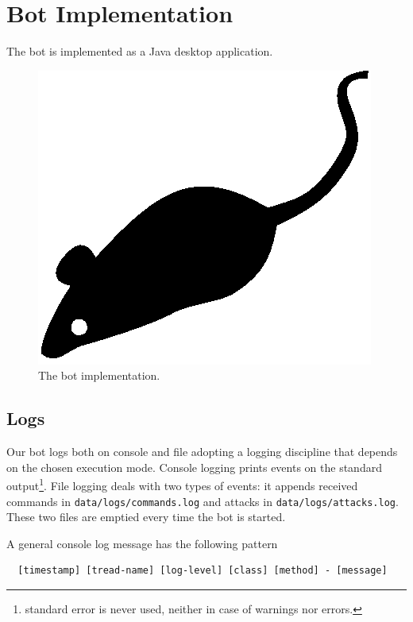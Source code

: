 \section{Bot Implementation}
\label{sec:bot-implementation}

The bot is implemented as a Java desktop application.

\begin{figure}[tp]
  \centering
  \includegraphics{./fig/acmlarge-mouse}
  \caption{The bot implementation.}
    \label{fig:bot-implementation}
\end{figure}

\subsection{Logs}
\label{sec:logs}

Our bot logs both on console and file adopting a logging discipline that depends on the chosen execution mode.
Console logging prints events on the standard output\footnote{standard error is never used, neither in case of warnings nor errors.}.
File logging deals with two types of events: it appends received commands in \texttt{data/logs/commands.log} and attacks in \texttt{data/logs/attacks.log}. These two files are emptied every time the bot is started.

A general console log message has the following pattern

\begin{verbatim}
  [timestamp] [tread-name] [log-level] [class] [method] - [message]
\end{verbatim}

